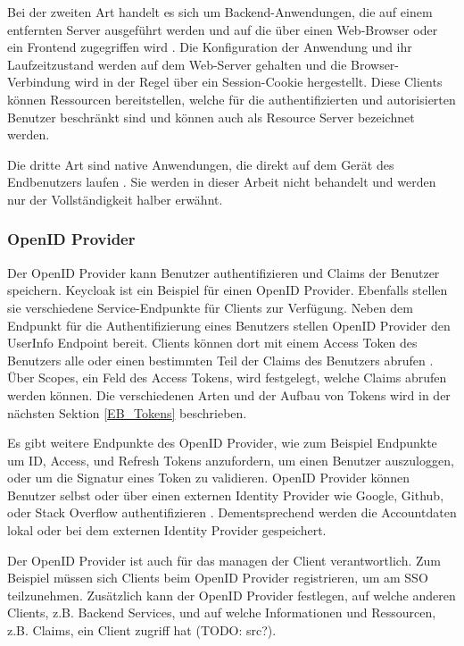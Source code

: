 Bei der zweiten Art handelt es sich um Backend-Anwendungen, die auf einem entfernten Server ausgeführt werden und auf die über einen Web-Browser oder ein Frontend zugegriffen wird \cite{OAuth2inAction}. Die Konfiguration der Anwendung und ihr Laufzeitzustand werden auf dem Web-Server gehalten und die Browser-Verbindung wird in der Regel über ein Session-Cookie hergestellt. Diese Clients können Ressourcen bereitstellen, welche für die authentifizierten und autorisierten Benutzer beschränkt sind und können auch als Resource Server bezeichnet werden.

Die dritte Art sind native Anwendungen, die direkt auf dem Gerät des Endbenutzers laufen \cite{OAuth2inAction}. Sie werden in dieser Arbeit nicht behandelt und werden nur der Vollständigkeit halber erwähnt.

\subsubsection{OpenID Provider}

Der OpenID Provider kann Benutzer authentifizieren und Claims der Benutzer speichern. Keycloak ist ein Beispiel für einen OpenID Provider. Ebenfalls stellen sie verschiedene Service-Endpunkte für Clients zur Verfügung. Neben dem Endpunkt für die Authentifizierung eines Benutzers stellen OpenID Provider den UserInfo Endpoint bereit. Clients können dort mit einem Access Token des Benutzers alle oder einen bestimmten Teil der Claims des Benutzers abrufen \cite{EB4}. Über Scopes, ein Feld des Access Tokens, wird festgelegt, welche Claims abrufen werden können. Die verschiedenen Arten und der Aufbau von Tokens wird in der nächsten Sektion \ref{EB_Tokens} beschrieben.

Es gibt weitere Endpunkte des OpenID Provider, wie zum Beispiel Endpunkte um ID, Access, und Refresh Tokens anzufordern, um einen Benutzer auszuloggen, oder um die Signatur eines Token zu validieren. OpenID Provider können Benutzer selbst oder über einen externen Identity Provider wie Google, Github, oder Stack Overflow authentifizieren \cite{EB7} \cite{EB6}. Dementsprechend werden die Accountdaten lokal oder bei dem externen Identity Provider gespeichert.

Der OpenID Provider ist auch für das managen der Client verantwortlich. Zum Beispiel müssen sich Clients beim OpenID Provider registrieren, um am SSO teilzunehmen. Zusätzlich kann der OpenID Provider festlegen, auf welche anderen Clients, z.B. Backend Services, und auf welche Informationen und Ressourcen, z.B. Claims, ein Client zugriff hat (TODO: src?).


